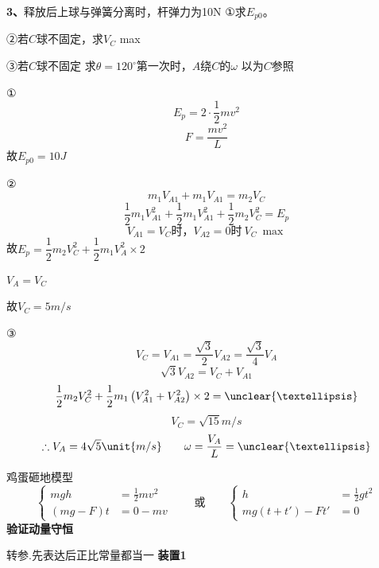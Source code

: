 \begin{problem}[3]
\textbf{3、}释放后上球与弹簧分离时，杆弹力为10N
①求$E_{p0}$。

②若$C$球不固定，求$V_C$ max

③若$C$球不固定 求$\theta=120^\circ$第一次时，$A$绕$C$的$\omega$
以为$C$参照
\begin{solution}
①
\[ E_p=2\cdot\dfrac{1}{2}mv^2 \]
\[ F=\dfrac{mv^2}{L} \]
故$E_{p0}=10\unit{J}$

②
\[ m_1V_{A1}+m_1V_{A1}=m_2V_C \]
\[ \dfrac{1}{2}m_1V_{A1}^2+\dfrac{1}{2}m_1V_{A1}^2+\dfrac{1}{2}m_2V_C^2=E_p \] %
\[ V_{A1}=V_C\text{时，}V_{A2}=0\text{时}\ V_C\ \max \]
故$E_p=\dfrac{1}{2}m_2V_C^2+\dfrac{1}{2}m_1V_A^2\times2$

$V_A=V_C$

故$V_C=5\unit{m/s}$

③
\[ V_C=V_{A1}=\dfrac{\sqrt{3}}{2}V_{A2}=\dfrac{\sqrt{3}}{4}V_A \]
\[ \sqrt{3}V_{A2}=V_C+V_{A1} \]
\[ \dfrac{1}{2}m_2V_C^2+\dfrac{1}{2}m_1\left(V_{A1}^2+V_{A2}^2\right)\times2=\unclear{…} \] %
\[ V_C=\sqrt{15}\unit{m/s} \]
\[ \therefore V_A=4\sqrt{5}\unit{m/s}\qquad \omega=\dfrac{V_A}{L}=\unclear{…} \] %
\end{solution}
\end{problem}
鸡蛋砸地模型
\[ \left\{\begin{aligned} mgh&=\tfrac12mv^2\\ (mg-F)t&=0-mv \end{aligned}\right. \qquad\text{或}\qquad \left\{\begin{aligned} h&=\tfrac12gt^2\\ mg(t+t')-Ft'&=0 \end{aligned}\right. \]
\textbf{验证动量守恒}

\hspace{2em}转参.先表达后正比常量都当一
\textbf{装置1}

